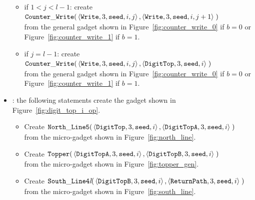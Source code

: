 \begin{itemize}
\begin{itemize}
        \item if $1 < j < l-1$: create
        $\begin{aligned}[t]
            {\tt Counter\_Write}(&\left\langle {\tt Write}, 3, {\tt seed}, i, j \right\rangle, \left\langle {\tt Write}, 3, {\tt seed}, i, j + 1 \right\rangle \;)
        \end{aligned}$\\from the general gadget shown in Figure~\ref{fig:counter_write_0} if $b = 0$ or Figure~\ref{fig:counter_write_1} if $b = 1$.

        \item if $j = l-1$: create
        $\begin{aligned}[t]
            {\tt Counter\_Write}(&\left\langle {\tt Write}, 3, {\tt seed}, i, j \right\rangle, \left\langle {\tt DigitTop}, 3, {\tt seed}, i \right\rangle \;)
        \end{aligned}$\\from the general gadget shown in Figure~\ref{fig:counter_write_0} if $b = 0$ or Figure~\ref{fig:counter_write_1} if $b = 1$.
    \end{itemize}

    \item {\dtop}: the following statements create the gadget shown in Figure~\ref{fig:digit_top_i_op}.
    \begin{itemize}
        \item Create
        $\begin{aligned}[t]
            {\tt North\_Line5}(&\left\langle {\tt DigitTop},  3, {\tt seed}, i \right\rangle,
                                \left\langle {\tt DigitTopA}, 3, {\tt seed}, i \right\rangle \;)
        \end{aligned}$\\from the micro-gadget shown in Figure~\ref{fig:north_line}.

        \item Create
        $\begin{aligned}[t]
            {\tt Topper}(&\left\langle {\tt DigitTopA}, 3, {\tt seed}, i \right\rangle,
                          \left\langle {\tt DigitTopB}, 3, {\tt seed}, i \right\rangle \;)
        \end{aligned}$\\from the micro-gadget shown in Figure~\ref{fig:topper_gen}.

        \item Create
        $\begin{aligned}[t]
            {\tt South\_Line4\textit{l}}(&\left\langle {\tt DigitTopB},  3, {\tt seed}, i \right\rangle,
                                          \left\langle {\tt ReturnPath}, 3, {\tt seed}, i \right\rangle \;)
        \end{aligned}$\\from the micro-gadget shown in Figure~\ref{fig:south_line}.
    \end{itemize}


\end{itemize}
